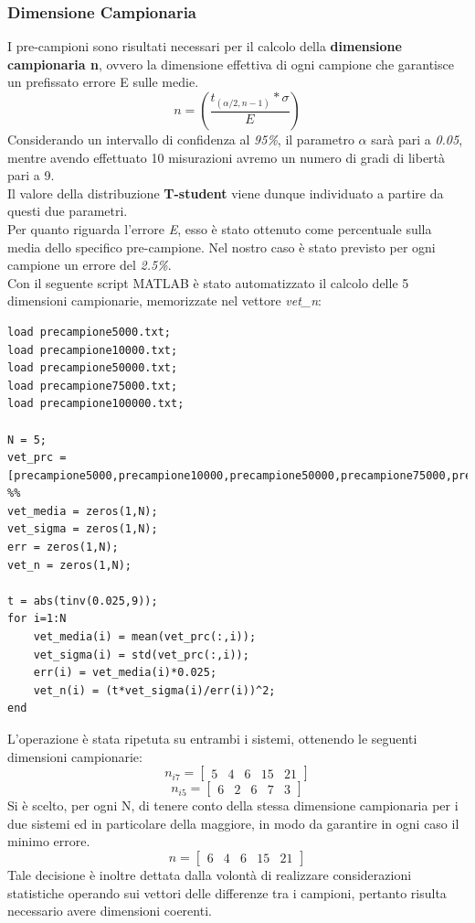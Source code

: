 \subsubsection{Dimensione Campionaria}
I pre-campioni sono risultati necessari per il calcolo della \textbf{dimensione campionaria n}, ovvero la dimensione effettiva di ogni campione che garantisce un prefissato errore E sulle medie.
\\
\begin{equation*}
	n = \left (\frac{t_{(\alpha/2,n-1)}*\sigma}{E}\right)
\end{equation*}
Considerando un intervallo di confidenza al \textit{95\%}, il parametro $\alpha$ sarà pari a \textit{0.05}, mentre avendo effettuato 10 misurazioni avremo un numero di gradi di libertà pari a 9.
\\
Il valore della distribuzione \textbf{T-student} viene dunque individuato a partire da questi due parametri.
\\
Per quanto riguarda l'errore \textit{E}, esso è stato ottenuto come percentuale sulla media dello specifico pre-campione. Nel nostro caso è stato previsto per ogni campione un errore del \textit{2.5\%}.
\\
Con il seguente script MATLAB è stato automatizzato il calcolo delle 5 dimensioni campionarie, memorizzate nel vettore \textit{vet\_n}:
\begin{verbatim}
load precampione5000.txt;
load precampione10000.txt;
load precampione50000.txt;
load precampione75000.txt;
load precampione100000.txt;

N = 5;
vet_prc = [precampione5000,precampione10000,precampione50000,precampione75000,precampione100000];
%%
vet_media = zeros(1,N);
vet_sigma = zeros(1,N);
err = zeros(1,N);
vet_n = zeros(1,N);

t = abs(tinv(0.025,9));
for i=1:N
	vet_media(i) = mean(vet_prc(:,i)); 
	vet_sigma(i) = std(vet_prc(:,i));
	err(i) = vet_media(i)*0.025; 
	vet_n(i) = (t*vet_sigma(i)/err(i))^2;
end
\end{verbatim}
L'operazione è stata ripetuta su entrambi i sistemi, ottenendo le seguenti dimensioni campionarie:
\begin{equation*}
	n_{i7} = \begin{bmatrix}
		5 & 4 & 6 & 15 & 21
	\end{bmatrix}
\end{equation*}
\begin{equation*}
	n_{i5} = \begin{bmatrix}
		6 & 2 & 6 & 7 & 3
	\end{bmatrix}
\end{equation*}
Si è scelto, per ogni N, di tenere conto della stessa dimensione campionaria per i due sistemi ed in particolare della maggiore, in modo da garantire in ogni caso il minimo errore.
\begin{equation*}
	n = \begin{bmatrix}
		6 & 4 & 6 & 15 & 21
	\end{bmatrix}
\end{equation*}
Tale decisione è inoltre dettata dalla volontà di realizzare considerazioni statistiche operando sui vettori delle differenze tra i campioni, pertanto risulta necessario avere dimensioni coerenti.
